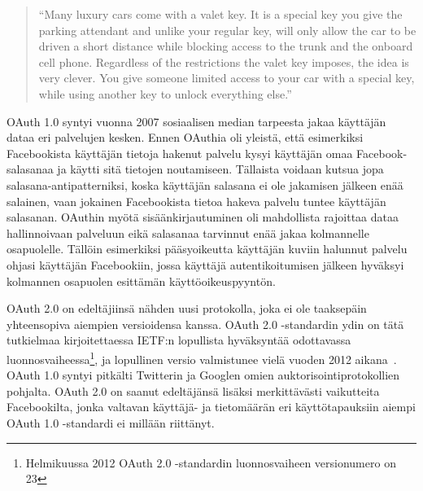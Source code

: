 \documentclass[finnish,gradu]{tktltiki}
\begin{document}
  \begin{quote}
    ``Many luxury cars come with a valet key. It is a special key you give the parking attendant and unlike your regular key, will only allow the car to be driven a short distance while blocking access to the trunk and the onboard cell phone. Regardless of the restrictions the valet key imposes, the idea is very clever. You give someone limited access to your car with a special key, while using another key to unlock everything else.''~\cite{hueniverse_oauth_intro}
  \end{quote}

  OAuth 1.0 syntyi vuonna 2007 sosiaalisen median tarpeesta jakaa käyttäjän dataa eri palvelujen kesken. Ennen OAuthia oli yleistä, että esimerkiksi Facebookista käyttäjän tietoja hakenut palvelu kysyi käyttäjän omaa Facebook-salasanaa ja käytti sitä tietojen noutamiseen. Tällaista voidaan kutsua jopa salasana-antipatterniksi, koska käyttäjän salasana ei ole jakamisen jälkeen enää salainen, vaan jokainen Facebookista tietoa hakeva palvelu tuntee käyttäjän salasanan. OAuthin myötä sisäänkirjautuminen oli mahdollista rajoittaa dataa hallinnoivaan palveluun eikä salasanaa tarvinnut enää jakaa kolmannelle osapuolelle. Tällöin esimerkiksi pääsyoikeutta käyttäjän kuviin halunnut palvelu ohjasi käyttäjän Facebookiin, jossa käyttäjä autentikoitumisen jälkeen hyväksyi kolmannen osapuolen esittämän käyttöoikeuspyyntön.

  OAuth 2.0 on edeltäjiinsä nähden uusi protokolla, joka ei ole taaksepäin yhteensopiva aiempien versioidensa kanssa. OAuth 2.0 -standardin ydin on tätä tutkielmaa kirjoitettaessa IETF:n lopullista hyväksyntää odottavassa luonnosvaiheessa\footnote{Helmikuussa 2012 OAuth 2.0 -standardin luonnosvaiheen versionumero on 23}, ja lopullinen versio valmistunee vielä vuoden 2012 aikana~\cite{fontana_oauth_closer_to_finish_2012, jones_oauth_closer_to_finish_2012}. OAuth 1.0 syntyi pitkälti Twitterin ja Googlen omien auktorisointiprotokollien pohjalta. OAuth 2.0 on saanut edeltäjänsä lisäksi merkittävästi vaikutteita Facebookilta, jonka valtavan käyttäjä- ja tietomäärän eri käyttötapauksiin aiempi OAuth 1.0 -standardi ei millään riittänyt.
\end{document}
